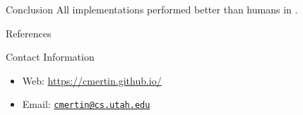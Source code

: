 \documentclass[final]{beamer}
\newlength{\onecolwid}
\begin{document}
\begin{frame}[t]
\begin{columns}[t]
\begin{column}{\onecolwid}
\begin{block}{Conclusion}
All implementations performed better than humans in \cite{MormonID}.

\end{block}


\begin{block}{References}

\nocite{*} %
\small{
\vspace{0.75in}}

\end{block}




\begin{alertblock}{Contact Information}

\begin{itemize}
\item Web: \href{http://cmertin.github.io}{\url{https://cmertin.github.io/}}
\item Email: \href{mailto:cmertin@cs.utah.edu}{\verb~cmertin@cs.utah.edu~}
\end{itemize}

\end{alertblock}



\end{column} %

\end{columns} %

\end{frame} %
\end{document}
